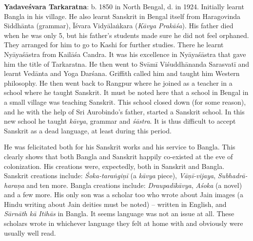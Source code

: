 \textbf{Yadaveśvara Tarkaratna}: b. 1850 in North Bengal, d. in 1924. Initially learnt Bangla in his village. He also learnt Sanskrit in Bengal itself from Haragovinda Siddhānta (grammar), Īśvara Vidyālaṅkara (\textit{Kāvya Prakāśa}). His father died when he was only 5, but his father’s students made sure he did not feel orphaned. They arranged for him to go to Kashi for further studies. There he learnt Nyāyaśāstra from Kailāśa Candra. It was his excellence in Nyāyaśāstra that gave him the title of Tarkaratna. He then went to Svāmī Viśuddhānanda Sarasvatī and learnt Vedānta and Yoga Darśana. Griffith called him and taught him Western philosophy. He then went back to Rangpur where he joined as a teacher in a school where he taught Sanskrit. It must be noted here that a school in Bengal in a small village was teaching Sanskrit. This school closed down (for some reason), and he with the help of Sri Aurobindo’s father, started a Sanskrit school. In this new school he taught \textit{kāvya}, grammar and \textit{śāstra}. It is thus difficult to accept Sanskrit as a dead language, at least during this period.

He was felicitated both for his Sanskrit works and his service to Bangla. This clearly shows that both Bangla and Sanskrit happily co-existed at the eve of colonization. His creations were, expectedly, both in Sanskrit and Bangla. Sanskrit creations include: \textit{Śoka-taraṅgiṇī} (a \textit{kāvya} piece), \textit{Vāṇī-vijaya}, \textit{Subhadrā-haraṇa} and ten more. Bangla creations include: \textit{Draupadīkāvya}, \textit{Aśoka} (a novel) and a few more. His only son was a scholar too who wrote about Jain images (a Hindu writing about Jain deities must be noted) – written in English, and \textit{Sārnāth kā Itihās} in Bangla. It seems language was not an issue at all. These scholars wrote in whichever language they felt at home with and obviously were usually well read.

